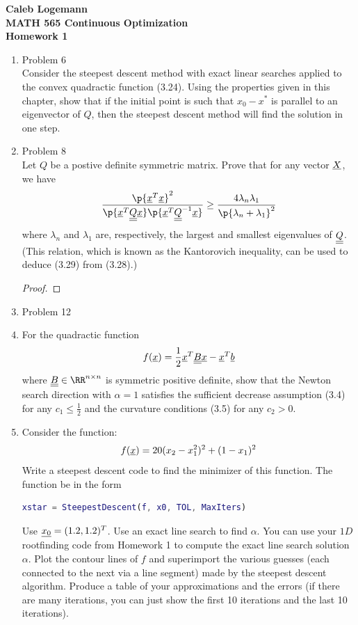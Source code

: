 \documentclass[11pt, oneside]{article}
\begin{document}
\noindent \textbf{\Large{Caleb Logemann \\
MATH 565 Continuous Optimization \\
Homework 1
}}

%
\begin{enumerate}
  \item %
    Problem 6 \\
    Consider the steepest descent method with exact linear searches applied to
    the convex quadractic function (3.24).
    Using the properties given in this chapter, show that if the initial point
    is such that $x_0 - x^*$ is parallel to an eigenvector of $Q$, then the
    steepest descent method will find the solution in one step.

  \item %
    Problem 8 \\
    Let $Q$ be a postive definite symmetric matrix.
    Prove that for any vector $\underline{X}$, we have
    \[
      \frac{\p{\v{x}^T\v{x}}^2}{\p{\v{x}^T \M{Q} \v{x}}\p{\v{x}^T \M{Q}^{-1} \v{x}}}
      \ge \frac{4\lambda_n \lambda_1}{\p{\lambda_n + \lambda_1}^2}
    \]
    where $\lambda_n$ and $\lambda_1$ are, respectively, the largest and
    smallest eigenvalues of $\underline{\underline{Q}}$.
    (This relation, which is known as the Kantorovich inequality, can be used to
    deduce (3.29) from (3.28).)

    \begin{proof}
      
    \end{proof}

  \item %
    Problem 12 \\

  \item %
    For the quadractic function
    \[
      f(\underline{x}) = \frac{1}{2} \underline{x}^T \underline{\underline{B}} \underline{x} - \underline{x}^T \underline{b}
    \]
    where $\M{B} \in \RR^{n \times n}$ is symmetric positive definite, show that the
    Newton search direction with $\alpha = 1$ satisfies the sufficient
    decrease assumption (3.4) for any $c_1 \le \frac{1}{2}$ and the curvature
    conditions (3.5) for any $c_2 > 0$.

  \item %
    Consider the function:
    \[
      f(\underline{x}) = 20(x_2 - x_1^2)^2 + (1 - x_1)^2
    \]
    Write a \MATLAB steepest descent code to find the minimizer of this function.
    The function be in the form
    \begin{lstlisting}[language=MATLAB, frame=none]
      xstar = SteepestDescent(f, x0, TOL, MaxIters)
    \end{lstlisting}
    Use $\underline{x_0} = (1.2, 1.2)^T$.
    Use an exact line search to find $\alpha$.
    You can use your $1D$ rootfinding code from Homework 1 to compute the exact
    line search solution $\alpha$.
    Plot the contour lines of $f$ and superimport the various guesses (each
    connected to the next via a line segment) made by the steepest descent
    algorithm.
    Produce a table of your approximations and the errors (if there are many
    iterations, you can just show the first 10 iterations and the last 10
    iterations).


\end{enumerate}
\end{document}
